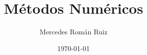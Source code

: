 \documentclass[10pt, a4paper, twoside, twocolumn]{book}
\title{Métodos Numéricos}
\author{Mercedes Román Ruiz}
\date{\today}
\theoremstyle{definition}
\begin{document}
\sloppy 
\setlength{\parindent}{30pt}
\setlength{\parskip}{6pt}
\renewcommand\thesection{\arabic{section}}
\renewcommand{\baselinestretch}{1.5}
\renewcommand{\listtablename}{Índice de tablas} %
\renewcommand{\tablename}{Tabla} %
\renewcommand{\baselinestretch}{1.5}

\fancyhead{}
\fancyfoot{}
\pagestyle{fancy}
\chead[\rightmark]{\leftmark}

\fancyfoot[LE,RO]{\thepage}



%





\onecolumn
\nocite{*}
\printbibliography
\end{document}
